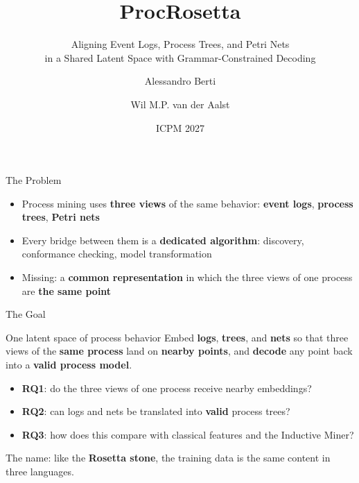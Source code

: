 \documentclass[aspectratio=169]{beamer}
\title[ProcRosetta]{\textbf{ProcRosetta}}
\subtitle{Aligning Event Logs, Process Trees, and Petri Nets\\in a Shared Latent Space with Grammar-Constrained Decoding}
\author[Berti, van der Aalst]{Alessandro Berti \and Wil M.P. van der Aalst}
\institute[PADS, RWTH]{Process and Data Science (PADS), RWTH Aachen University}
\date{ICPM 2027}
\newcommand{\keyc}[1]{\textbf{\textcolor{procblue}{#1}}}
\newcommand{\keyg}[1]{\textbf{\textcolor{procgreen!70!black}{#1}}}
\newcommand{\keya}[1]{\textbf{\textcolor{procamber!85!black}{#1}}}
\begin{document}
\begin{frame}
  \titlepage
\end{frame}

\begin{frame}{The Problem}
  \begin{itemize}\setlength{\itemsep}{9pt}
    \item Process mining uses \keyc{three views} of the same behavior:
      \keyc{event logs}, \keyc{process trees}, \keyc{Petri nets}
    \item Every bridge between them is a \keya{dedicated algorithm}:
      discovery, conformance checking, model transformation
    \item Missing: a \keyg{common representation} in which the three views
      of one process are \keyg{the same point}
  \end{itemize}
  \vspace{4mm}
  \begin{center}
  \end{center}
\end{frame}

\begin{frame}{The Goal}
  \begin{block}{One latent space of process behavior}
    Embed \keyc{logs}, \keyc{trees}, and \keyc{nets} so that three views of
    the \keyg{same process} land on \keyg{nearby points},
    and \keya{decode} any point back into a \keya{valid process model}.
  \end{block}
  \vspace{4mm}
  \begin{itemize}\setlength{\itemsep}{7pt}
    \item \keyc{RQ1}: do the three views of one process receive nearby embeddings?
    \item \keyc{RQ2}: can logs and nets be translated into \keyg{valid} process trees?
    \item \keyc{RQ3}: how does this compare with classical features and the Inductive Miner?
  \end{itemize}
  \vspace{3mm}
  \small The name: like the \keya{Rosetta stone}, the training data is the same
  content in three languages.
\end{frame}
\end{document}
